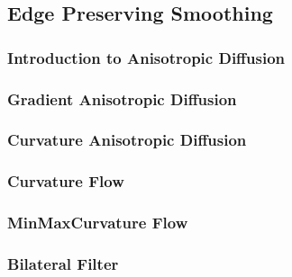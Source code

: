 \ifitkFullVersion

\fi

\subsection{Edge Preserving Smoothing}
\label{sec:EdgePreservingSmoothingFilters}

\subsubsection{Introduction to Anisotropic Diffusion}
\label{sec:IntroductionAnisotropicDiffusion}
\ifitkFullVersion

\fi


\subsubsection{Gradient Anisotropic Diffusion}
\label{sec:GradientAnisotropicDiffusionImageFilter}

\ifitkFullVersion

\fi



\subsubsection{Curvature Anisotropic Diffusion}
\label{sec:CurvatureAnisotropicDiffusionImageFilter}

\ifitkFullVersion

\fi

\subsubsection{Curvature Flow}
\label{sec:CurvatureFlowImageFilter}

\ifitkFullVersion

\fi

\subsubsection{MinMaxCurvature Flow}
\label{sec:MinMaxCurvatureFlowImageFilter}

\ifitkFullVersion

\fi


\subsubsection{Bilateral Filter}
\label{sec:BilateralImageFilter}

